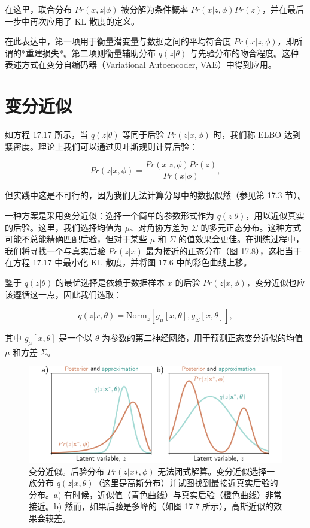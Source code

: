 在这里，联合分布 \(Pr(x, z|\phi)\) 被分解为条件概率 \(Pr(x|z, \phi)Pr(z)\)，并在最后一步中再次应用了 KL 散度的定义。

在此表达中，第一项用于衡量潜变量与数据之间的平均符合度 \(Pr(x|z, \phi)\)，即所谓的*重建损失*。第二项则衡量辅助分布 \(q(z|\theta)\) 与先验分布的吻合程度。这种表述方式在变分自编码器（Variational Autoencoder, VAE）中得到应用。


\section{变分近似}
如方程 17.17 所示，当 \(q(z|\theta)\) 等同于后验 \(Pr(z|x, \phi)\) 时，我们称 ELBO 达到紧密度。理论上我们可以通过贝叶斯规则计算后验：

\begin{equation}
Pr(z|x, \phi) = \frac{Pr(x|z, \phi)Pr(z)}{Pr(x|\phi)}, 
\end{equation}

但实践中这是不可行的，因为我们无法计算分母中的数据似然（参见第 17.3 节）。

一种方案是采用变分近似：选择一个简单的参数形式作为 \(q(z|\theta)\)，用以近似真实的后验。这里，我们选择均值为 \(\mu\)、对角协方差为 \(\Sigma\) 的多元正态分布。这种方式可能不总能精确匹配后验，但对于某些 \(\mu\) 和 \(\Sigma\) 的值效果会更佳。在训练过程中，我们将寻找一个与真实后验 \(Pr(z|x)\) 最为接近的正态分布（图 17.8），这相当于在方程 17.17 中最小化 KL 散度，并将图 17.6 中的彩色曲线上移。

鉴于 \(q(z|\theta)\) 的最优选择是依赖于数据样本 \(x\) 的后验 \(Pr(z|x, \phi)\)，变分近似也应该遵循这一点，因此我们选取：

\begin{equation}
q(z|x, \theta) = \text{Norm}_z \left[ g_\mu[x, \theta], g_\Sigma[x, \theta] \right], 
\end{equation}

其中 \(g_\mu[x, \theta]\) 是一个以 \(\theta\) 为参数的第二神经网络，用于预测正态变分近似的均值 \(\mu\) 和方差 \(\Sigma\)。

\begin{figure}[ht!]
\centering
\includegraphics[width=0.7\linewidth]{png/chapter17/VAEVariational.png}
\caption{变分近似。后验分布 \(Pr(z|x∗, \phi)\) 无法闭式解算。变分近似选择一族分布 \(q(z|x, \theta)\)（这里是高斯分布）并试图找到最接近真实后验的分布。a) 有时候，近似值（青色曲线）与真实后验（橙色曲线）非常接近。b) 然而，如果后验是多峰的（如图 17.7 所示），高斯近似的效果会较差。}
\end{figure}

